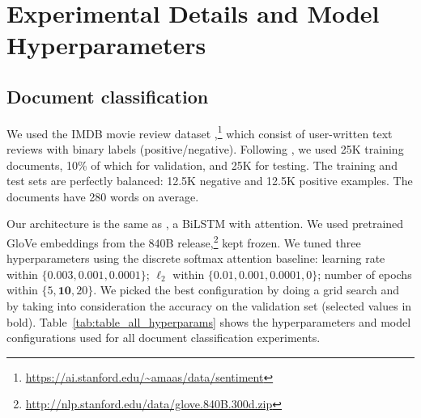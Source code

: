 \documentclass{article}
\begin{document}
\section{Experimental Details and Model Hyperparameters}\label{sec:model_hyperparams}

\subsection{Document classification}

We used the IMDB movie review dataset \citep{maas2011learning},\footnote{\url{https://ai.stanford.edu/~amaas/data/sentiment}} which consist of user-written text reviews with binary labels (positive/negative). 
Following \citep{jain2019attention}, we used 25K training documents, 10\% of which for validation, and 25K for testing. The training and test sets are perfectly balanced: 12.5K negative and 12.5K positive examples. 
The documents have 280 words on average.  

Our architecture is the same as \citep{maas2011learning}, a BiLSTM with attention. 
We used pretrained GloVe embeddings from the 840B release,\footnote{\url{http://nlp.stanford.edu/data/glove.840B.300d.zip}} kept frozen. 
We tuned three hyperparameters using the discrete softmax attention baseline:
learning rate within $\{0.003, \mathbf{0.001}, 0.0001\}$; $\ell_2$ within $\{0.01, 0.001, \mathbf{0.0001}, 0\}$; number of epochs within $\{5, \mathbf{10}, 20\}$. 
We picked the best configuration by doing a grid search and by taking into consideration the accuracy on the validation set (selected values in bold).
Table~\ref{tab:table_all_hyperparams} shows the hyperparameters and model configurations used for all document classification experiments.
\end{document}
